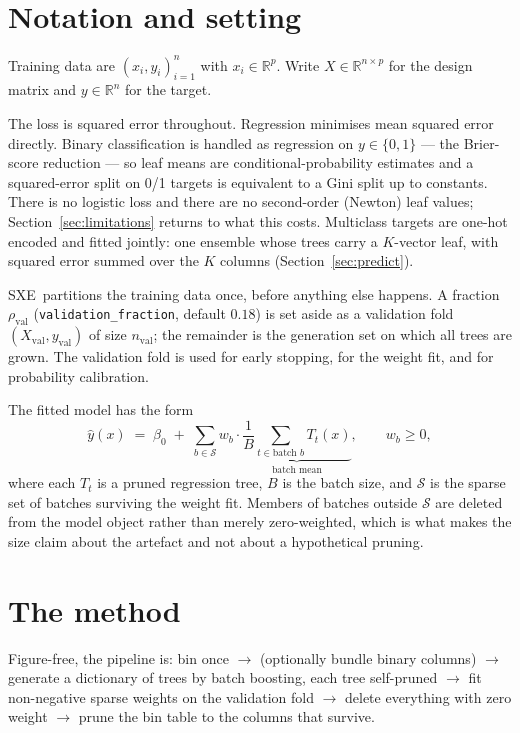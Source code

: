 \documentclass[11pt,a4paper]{article}
\newcommand{\code}[1]{\texttt{\small #1}}
\newcommand{\SXE}{\textsc{SXE}}
\theoremstyle{definition}
\begin{document}
\section{Notation and setting}\label{sec:notation}

Training data are $(x_i, y_i)_{i=1}^{n}$ with $x_i \in \mathbb{R}^p$. Write
$X \in \mathbb{R}^{n\times p}$ for the design matrix and $y \in \mathbb{R}^n$
for the target.

The loss is squared error throughout. Regression minimises mean squared error
directly. Binary classification is handled as regression on $y \in \{0,1\}$ ---
the Brier-score reduction --- so leaf means are conditional-probability
estimates and a squared-error split on 0/1 targets is equivalent to a Gini
split up to constants. There is no logistic loss and there are no second-order
(Newton) leaf values; Section~\ref{sec:limitations} returns to what this costs.
Multiclass targets are one-hot encoded and fitted jointly: one ensemble whose
trees carry a $K$-vector leaf, with squared error summed over the $K$ columns
(Section~\ref{sec:predict}).

\SXE\ partitions the training data once, before anything else happens. A
fraction $\rho_{\text{val}}$ (\code{validation\_fraction}, default $0.18$) is
set aside as a validation fold $(X_{\text{val}}, y_{\text{val}})$ of size
$n_{\text{val}}$; the remainder is the generation set on which all trees are
grown. The validation fold is used for early stopping, for the weight fit, and
for probability calibration.

The fitted model has the form
\begin{equation}\label{eq:model}
\hat{y}(x) \;=\; \beta_0 \;+\; \sum_{b \in \mathcal{S}} w_b \cdot
\underbrace{\frac{1}{B}\sum_{t \in \text{batch } b} T_t(x)}_{\text{batch mean}},
\qquad w_b \ge 0,
\end{equation}
where each $T_t$ is a pruned regression tree, $B$ is the batch size, and
$\mathcal{S}$ is the sparse set of batches surviving the weight fit. Members of
batches outside $\mathcal{S}$ are deleted from the model object rather than
merely zero-weighted, which is what makes the size claim about the artefact and
not about a hypothetical pruning.

\section{The method}\label{sec:method}

Figure-free, the pipeline is: bin once $\rightarrow$ (optionally bundle binary
columns) $\rightarrow$ generate a dictionary of trees by batch boosting, each
tree self-pruned $\rightarrow$ fit non-negative sparse weights on the
validation fold $\rightarrow$ delete everything with zero weight $\rightarrow$
prune the bin table to the columns that survive.
\end{document}
